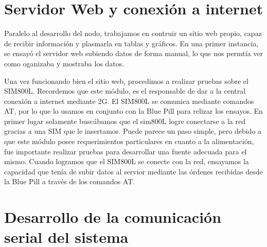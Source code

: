 \section{Servidor Web y conexión a internet}

Paralelo al desarrollo del nodo, trabajamos en contruir un sitio web propio, capaz de recibir información y plasmarla en tablas y gráficos.
En una primer instancia, se ensayó el servidor web subiendo datos de forma manual, lo que nos permtía ver como oganizaba y mostraba los datos. \par
Una vez funcionando bien el sitio web, procedimos a realizar pruebas sobre el SIM800L. Recordemos que este módulo, es el responsable de dar a la central conexión
a internet mediante 2G.
El SIM800L se comunica mediante comandos AT, por lo que lo usamos en conjunto con la Blue Pill para relizar los ensayos. En primer lugar solamente
buscábamos que el sim800L logre conectarse a la red gracias a una SIM que le insertamos. Puede parece un paso simple, pero debido a que este módulo
posee requerimientos particulares en cuanto a la alimentación, fue importante realizar pruebas para desarrollar una fuente adecuada para el mismo.
Cuando logramos que el SIM800L se conecte con la red, ensayamos la capacidad que tenía de subir datos al servior mediante las órdenes recibidas desde 
la Blue Pill a través de los comandos AT.\par 

\section{Desarrollo de la comunicación serial del sistema}

